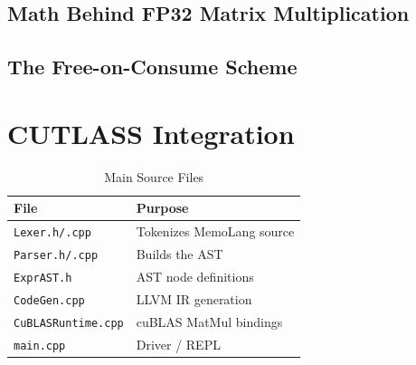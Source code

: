 \documentclass[a4paper]{article}
\begin{document}
	\subsection{Math Behind FP32 Matrix Multiplication}
	
	
	\subsection{The Free-on-Consume Scheme}
	
	
	\section{CUTLASS Integration}
	
	
	\begin{table}[h]
		\centering
		\caption{Main Source Files}
		\label{tab:modules}
		\begin{tabular}{ll}
			\toprule
			File & Purpose \\
			\midrule
			\texttt{Lexer.h/.cpp} & Tokenizes MemoLang source \\
			\texttt{Parser.h/.cpp} & Builds the AST \\
			\texttt{ExprAST.h} & AST node definitions \\
			\texttt{CodeGen.cpp} & LLVM IR generation \\
			\texttt{CuBLASRuntime.cpp} & cuBLAS MatMul bindings \\
			\texttt{main.cpp} & Driver / REPL \\
			\bottomrule
		\end{tabular}
	\end{table}
	
	
\end{document}
